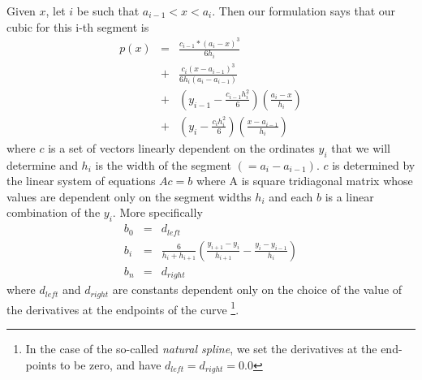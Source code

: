 Given $x$, let $i$ be such that $a_{i-1} < x < a_i$.  Then our
formulation says that our cubic for this i-th segment is
\begin{eqnarray}
p(x) &=& \frac{c_{i-1}*(a_i-x)^3}{6h_i} \nonumber\\
&+& \frac{c_i(x-a_{i-1})^3}{6h_i(a_i-a_{i-1})} \nonumber\\
&+& (y_{i-1} - \frac{c_{i-1}h_i^2}{6})(\frac{a_i-x}{h_i}) \nonumber\\
&+& (y_i - \frac{c_{i}h_i^2}{6})(\frac{x-a_{i-1}}{h_i})
\end{eqnarray}
where $c$ is a set of vectors linearly dependent on the ordinates
$y_{i}$ that we will determine and $h_i$ is the width of the segment
$(=a_i-a_{i-1})$.
$c$ is determined by the linear system of equations $Ac=b$ where A is
square tridiagonal matrix whose values are dependent only on the
segment widths $h_i$ and each $b$ is a linear combination of the
$y_i$. More specifically
\begin{eqnarray}
b_0 &=& d_{left} \nonumber\\
b_i &=& \frac{6}{h_i+h_{i+1}}(\frac{y_{i+1}-y_i}{h_{i+1}} - \frac{y_i - y_{i-1}}{h_{i}}) \nonumber\\
b_n &=& d_{right}
\end{eqnarray}
where $d_{left}$ and $d_{right}$ are constants dependent only on the
choice of the value of the derivatives at the endpoints of the curve
\footnote{In the case of the so-called \emph{natural spline}, we set
the derivatives at the end-points to be zero, and have
$d_{left}=d_{right}=0.0$}.
